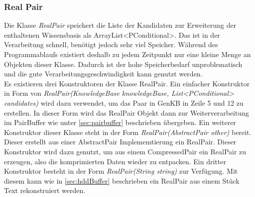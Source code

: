 \documentclass[12pt,a4paper]{article}
\begin{document}
\subsubsection{Real Pair}
\label{sec:realpair}
Die Klasse \textit{RealPair} speichert die Liste der Kandidaten zur Erweiterung der enthaltenen Wissensbasis als ArrayList<PConditional>. Das ist in der Verarbeitung schnell, benötigt jedoch sehr viel Speicher. Während des Programmablaufs existiert deshalb zu jedem Zeitpunkt nur eine kleine Menge an Objekten dieser Klasse. Dadurch ist der hohe Speicherbedarf unproblematisch und die gute Verarbeitungsgeschwindigkeit kann genutzt werden. \\
Es existieren drei Konstruktoren der Klasse RealPair. Ein einfacher Konstruktor in Form von \textit{RealPair(KnowledgeBase knowledgeBase, List<PConditional> candidates)} wird dazu verwendet, um das Paar in GenKB in Zeile 5 und 12 zu erstellen. In dieser Form wird das RealPair Objekt dann zur Weiterverarbeitung im PairBuffer wie unter \ref{sec:pairbuffer} beschrieben übergeben. Ein weiterer Konstruktor dieser Klasse steht in der Form \textit{RealPair(AbstractPair other)} bereit. Dieser erstellt aus einer AbstractPair Implememtierung ein RealPair. Dieser Konstruktor wird dazu genutzt, um aus einem CompressedPair ein RealPair zu erzeugen, also die komprimierten Daten wieder zu entpacken. Ein dritter Konstruktor besteht in der Form \textit{RealPair(String string)} zur Verfügung. Mit diesem kann wie in \autoref{sec:hddBuffer} beschrieben ein RealPair aus einem Stück Text rekonstruiert werden.
\end{document}

